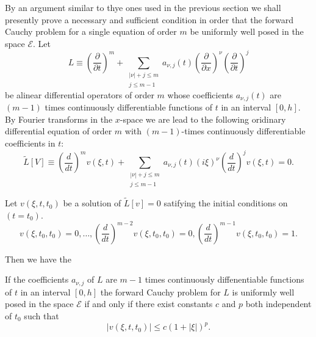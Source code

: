 By an argument similar to thye ones used in the previous section we
shall presently prove a necessary and sufficient condition in order
that the forward Cauchy problem for a single equation of order $m$ be
uniformly well posed in the space $\mathscr{E}$. Let 
\begin{equation*}
L\equiv \left(\frac{\partial}{\partial t}\right)^m + \sum_{\substack{|
    \nu | +j \leq  m \\ j \leq m-1}} a_{\nu ,  j} (t)
\left(\frac{\partial}{\partial x}\right)^{\nu}
\left(\frac{\partial}{\partial t}\right)^j \tag{3.1}\label{chap2-eq3.1}    
\end{equation*}
be a\pageoriginale linear differential operators of order $m$ whose
coefficients 
$a_{\nu, j}(t)$ are $(m-1)$ times continuously differentiable
functions of $t$ in an interval $[0, h]$. By Fourier transforms in the
$x$-space we are lead to the following oridinary differential equation
of order $m$ with $(m-1)$-times continuously differentiable
coefficients in $t$: 
\begin{equation*}
\tilde{L} [V] \equiv \left(\frac{d}{dt}\right)^m v(\xi,  t) +
\sum_{\substack{|\nu| + j \leq m\\j \leq m-1}}a_{\nu,j}(t) (i \xi
)^\nu \left(\frac{d}{dt}\right)^j v (\xi, t) =
0. \tag{3.2}\label{chap2-eq3.2}      
\end{equation*}

Let $v(\xi, t, t_0)$ be a solution of $\tilde{L}[v] = 0$ satifying the
initial conditions on $(t=t_0)$. 
$$
v(\xi, t_0, t_0) = 0, \ldots ,  (\frac{d}{dt})^{m-2} v(\xi,  t_0, 
t_0) = 0,  (\frac{d}{dt})^{m-1} v(\xi,  t_0 ,  t_0) =1. 
$$

Then we have the 

\setcounter{proposition}{0}
\begin{proposition}\label{chap2-sec3-prop1} %
If the coefficients $a_{\nu, j}$ of $L$ are $m-1$ times continuously
diffenentiable functions of $t$ in an interval $[0, h]$ the forward
Cauchy problem for $L$ is uniformly well posed in the space
$\mathscr{E}$ if and only if there exist constants $c$ and $p$ both
independent of $t_0$ such that  
\begin{equation*}
| v (\xi,  t, t_0)| \leq c(1+|\xi|)^p. \tag{3.3}\label{chap2-eq3.3}    
\end{equation*}
\end{proposition}

